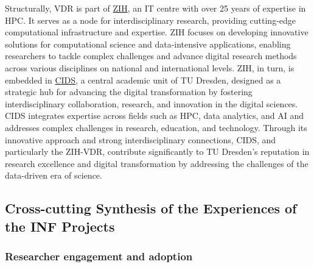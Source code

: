 \documentclass{eceasst}
\begin{document}
Structurally, VDR is part of \href{https://tu-dresden.de/zih}{ZIH}, an IT centre with over 25 years of expertise in HPC.
It serves as a node for interdisciplinary research, providing cutting-edge computational infrastructure and expertise.
ZIH focuses on developing innovative solutions for computational science and data-intensive applications,
enabling researchers to tackle complex challenges and advance digital research methods across various disciplines on national and international levels.
ZIH, in turn, is embedded in \href{https://tu-dresden.de/cids}{CIDS}, a central academic unit of TU Dresden, designed as a
strategic hub for advancing the digital transformation by fostering interdisciplinary collaboration, research, and innovation in the digital sciences.
CIDS integrates expertise across fields such as HPC, data analytics, and AI and addresses complex challenges in research, education, and technology.
Through its innovative approach and strong interdisciplinary connections, CIDS, and particularly the ZIH-VDR, contribute significantly
to TU Dresden’s reputation in research excellence and digital transformation by addressing the challenges of the data-driven era of science.

\subsection{Cross-cutting Synthesis of the Experiences of the INF Projects}
\label{sec:cross-project-synthesis}

\subsubsection{Researcher engagement and adoption}
\end{document}
